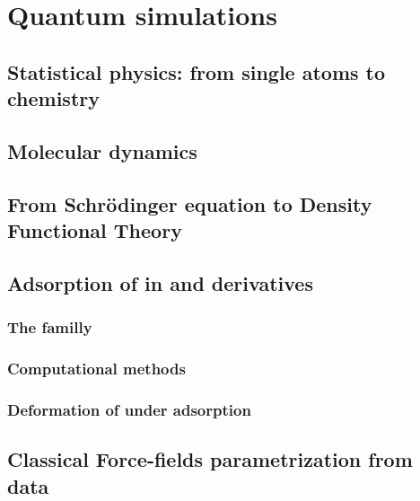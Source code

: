 \documentclass[thesis]{subfiles}
\begin{document}
\chapter{Quantum simulations}
\startcontents[chapters]
\printpartialtoc

\section{Statistical physics: from single atoms to chemistry}

\section{Molecular dynamics}

\section{From Schrödinger equation to Density Functional Theory}


\section{Adsorption of  in  and derivatives}

\subsection{The  familly}

\subsection{Computational methods}

\subsection{Deformation of  under adsorption}

\section{Classical Force-fields parametrization from \abinitio data}
\end{document}

